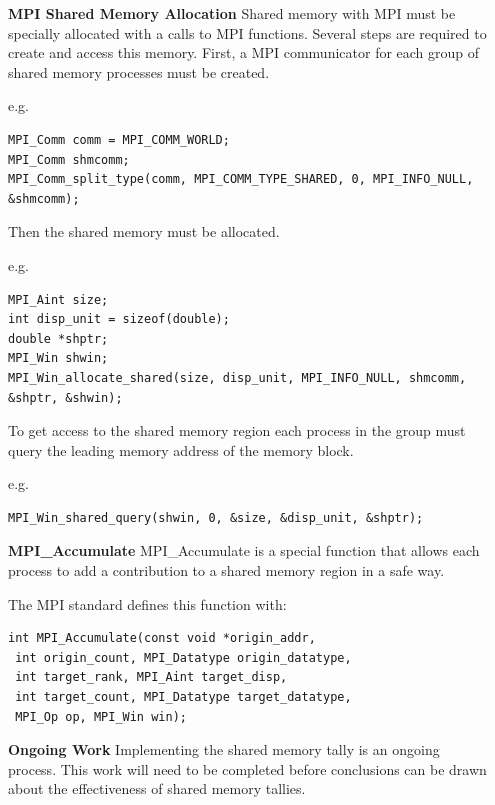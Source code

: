 \documentclass{beamer}
\begin{document}
\begin{frame}[t,fragile]{}
\begin{columns}[t,totalwidth=\textwidth]
\begin{column}{0.310\textwidth}
\end{column}

\begin{column}{0.36\textwidth}

\begin{block}{\LARGE\textbf{MPI Shared Memory Allocation}}
Shared memory with MPI must be specially allocated with a calls to MPI functions.
Several steps are required to create and access this memory.
First, a MPI communicator for each group of shared memory processes must be created.

e.g.
\begin{lstlisting}
MPI_Comm comm = MPI_COMM_WORLD;
MPI_Comm shmcomm;
MPI_Comm_split_type(comm, MPI_COMM_TYPE_SHARED, 0, MPI_INFO_NULL, &shmcomm);
\end{lstlisting}
Then the shared memory must be allocated.

e.g.
\begin{lstlisting}
MPI_Aint size;
int disp_unit = sizeof(double);
double *shptr;
MPI_Win shwin;
MPI_Win_allocate_shared(size, disp_unit, MPI_INFO_NULL, shmcomm, &shptr, &shwin);
\end{lstlisting}
To get access to the shared memory region each process in the group must query the leading
memory address of the memory block.

e.g.
\begin{lstlisting}
MPI_Win_shared_query(shwin, 0, &size, &disp_unit, &shptr);
\end{lstlisting}
\end{block}

\begin{block}{\LARGE\textbf{MPI\_Accumulate}}
MPI\_Accumulate is a special function that allows each process to add a contribution to
a shared memory region in a safe way.

The MPI standard defines this function with:
\begin{lstlisting}
int MPI_Accumulate(const void *origin_addr,
 int origin_count, MPI_Datatype origin_datatype,
 int target_rank, MPI_Aint target_disp,
 int target_count, MPI_Datatype target_datatype,
 MPI_Op op, MPI_Win win);
\end{lstlisting}
\end{block}

\begin{block}{\LARGE\textbf{Ongoing Work}}
Implementing the shared memory tally is an ongoing process.
This work will need to be completed before conclusions can be drawn about the effectiveness
of shared memory tallies.
\end{block}

\end{column}

\end{columns}

\end{frame}
\end{document}
